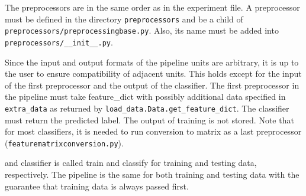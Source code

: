 The preprocessors are in the same order as in the experiment file.
A preprocessor must be defined in the directory \texttt{preprocessors} and be a child of \texttt{preprocessors/preprocessingbase.py}.
Also, its name must be added into \texttt{preprocessors/\_\_init\_\_.py}.

Since the input and output formats of the pipeline units are arbitrary,
it is up to the user to ensure compatibility of adjacent units.
This holds except for the input of the first preprocessor and the output of the classifier.
The first preprocessor in the pipeline must take feature\_dict with possibly additional data specified in \texttt{extra\_data} as returned by \texttt{load\_data.Data.get\_feature\_dict}.
The classifier must return the predicted label.
The output of training is not stored.
Note that for most classifiers, it is needed to run conversion to matrix as a last preprocessor (\texttt{featurematrixconversion.py}).

and classifier is called train and classify for
training and testing data, respectively.
The pipeline is the same for both training and testing data with the guarantee that
training data is always passed first.
